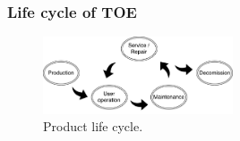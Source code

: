 \documentclass[10pt]{article}
\begin{document}

    \subsubsection{Life cycle of TOE}
      \begin{figure}[!h]
        \center
        \includegraphics[width=0.5\textwidth]{input/cycle.pdf}
        \caption{Product life cycle.}
      \end{figure}
\end{document}
